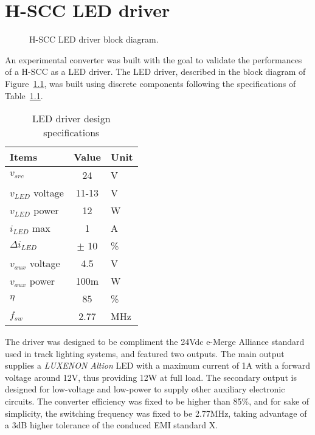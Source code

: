\chapter{H-SCC LED driver}
\label{ch:hscc_led_driver}


\begin{figure}[!h]
\centering

\caption[H-SCC LED driver block diagram]{H-SCC LED driver block diagram.}
\label{fig:bd_emerge_drv}
\end{figure}


An experimental converter was built with the goal to validate the performances of a H-SCC as a LED driver. The LED driver, described in the block diagram of Figure~\ref{fig:bd_emerge_drv}, was built using discrete components following the specifications of Table~\ref{tab:dsg_param_drv}.

\begin{table}[!h]
 \caption{LED driver design specifications}\label{tab:dsg_param_drv}
 \centering
 \renewcommand{\arraystretch}{1.2}
 \begin{tabular}{l | cl}
  Items & Value & Unit \\
  \midrule
  $v_{src}$ & 24 & V \\
  \hline
  $v_{LED}$ voltage & 11-13 & V \\
  $v_{LED}$ power & 12 & W \\
  $i_{LED}$ max & 1 & A \\
  $\Delta i_{LED}$ & $\pm$ 10 & \% \\
  \hline
  $v_{aux}$ voltage & 4.5 & V \\
  $v_{aux}$ power & 100m & W \\
  \hline
  $\eta$  & 85 & \% \\
  $f_{sw}$ & 2.77 & MHz\\
\end{tabular}
\end{table}

The driver was designed to be compliment the 24Vdc e-Merge Alliance standard used in track lighting systems, and featured two outputs. The main output supplies a \emph{LUXENON Altion} LED with a maximum current of 1A with a forward voltage around 12V, thus providing 12W at full load. The secondary output is designed for low-voltage and low-power to supply other auxiliary electronic circuits. The converter efficiency was fixed to be higher than 85\%, and for sake of simplicity, the switching frequency was fixed to be 2.77MHz, taking advantage of a 3dB higher tolerance of the conduced EMI standard X.

